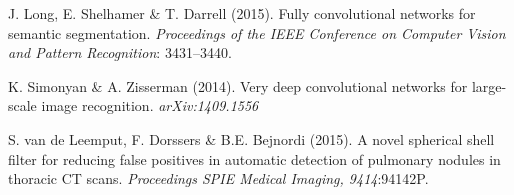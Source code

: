 \documentclass{article}
\begin{document}
\begin{thebibliography}{}
J. Long, E. Shelhamer \& T. Darrell (2015). Fully convolutional networks for semantic segmentation. \emph{Proceedings of the IEEE Conference on Computer Vision and Pattern Recognition}: 3431--3440.

K. Simonyan \& A. Zisserman (2014). Very deep convolutional networks for large-scale image recognition. \emph{arXiv:1409.1556}

S. van de Leemput, F. Dorssers \& B.E. Bejnordi (2015). A novel spherical shell filter for reducing false positives in automatic detection of pulmonary nodules in thoracic CT scans. \emph{Proceedings SPIE Medical Imaging, 9414}:94142P.

\end{thebibliography}
\end{document}
